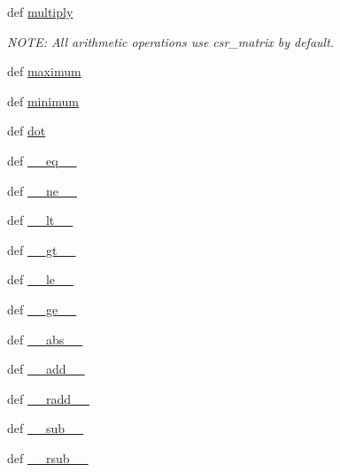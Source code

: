 \begin{DoxyCompactItemize}
\item 
def \hyperlink{classscipy_1_1sparse_1_1base_1_1spmatrix_a7ad2059f8c82af8c192843e02fd96b14}{multiply}
\begin{DoxyCompactList}\small\item\em N\+O\+T\+E\+: All arithmetic operations use csr\+\_\+matrix by default. \end{DoxyCompactList}\item 
def \hyperlink{classscipy_1_1sparse_1_1base_1_1spmatrix_a5da2516200dfa651e5ed5749c7664acb}{maximum}
\item 
def \hyperlink{classscipy_1_1sparse_1_1base_1_1spmatrix_ab8cb8e156a2e6f25c26f18eedaabf54d}{minimum}
\item 
def \hyperlink{classscipy_1_1sparse_1_1base_1_1spmatrix_a798216f7079a2bee8c1d1c45e467c0a9}{dot}
\item 
def \hyperlink{classscipy_1_1sparse_1_1base_1_1spmatrix_a17e2721dc044db30f16031dd5ad7f3c8}{\+\_\+\+\_\+eq\+\_\+\+\_\+}
\item 
def \hyperlink{classscipy_1_1sparse_1_1base_1_1spmatrix_a588614764b91023b25b4f962cdcc44eb}{\+\_\+\+\_\+ne\+\_\+\+\_\+}
\item 
def \hyperlink{classscipy_1_1sparse_1_1base_1_1spmatrix_aaee8291e6bbfb7ee4e96e0192d8bbb15}{\+\_\+\+\_\+lt\+\_\+\+\_\+}
\item 
def \hyperlink{classscipy_1_1sparse_1_1base_1_1spmatrix_aa63651902503b3883fe5782c6779d355}{\+\_\+\+\_\+gt\+\_\+\+\_\+}
\item 
def \hyperlink{classscipy_1_1sparse_1_1base_1_1spmatrix_aa462fd2ea2daaf2d365c193a488af688}{\+\_\+\+\_\+le\+\_\+\+\_\+}
\item 
def \hyperlink{classscipy_1_1sparse_1_1base_1_1spmatrix_ae1d2ccfde7f12f08fab0b10f67d549ff}{\+\_\+\+\_\+ge\+\_\+\+\_\+}
\item 
def \hyperlink{classscipy_1_1sparse_1_1base_1_1spmatrix_ad669ad4d5d4e5fb5396c220cd60627b1}{\+\_\+\+\_\+abs\+\_\+\+\_\+}
\item 
def \hyperlink{classscipy_1_1sparse_1_1base_1_1spmatrix_af1666173a90f85c8f5a87f138e3c37b6}{\+\_\+\+\_\+add\+\_\+\+\_\+}
\item 
def \hyperlink{classscipy_1_1sparse_1_1base_1_1spmatrix_a021ba963d9798a1ad18f0fd6267c4be6}{\+\_\+\+\_\+radd\+\_\+\+\_\+}
\item 
def \hyperlink{classscipy_1_1sparse_1_1base_1_1spmatrix_ad53d4acf712f40e6ae7d09c2a3f4e8c3}{\+\_\+\+\_\+sub\+\_\+\+\_\+}
\item 
def \hyperlink{classscipy_1_1sparse_1_1base_1_1spmatrix_acc5d1c6ab98337857c279175dbfc9a95}{\+\_\+\+\_\+rsub\+\_\+\+\_\+}

\end{DoxyCompactItemize}
